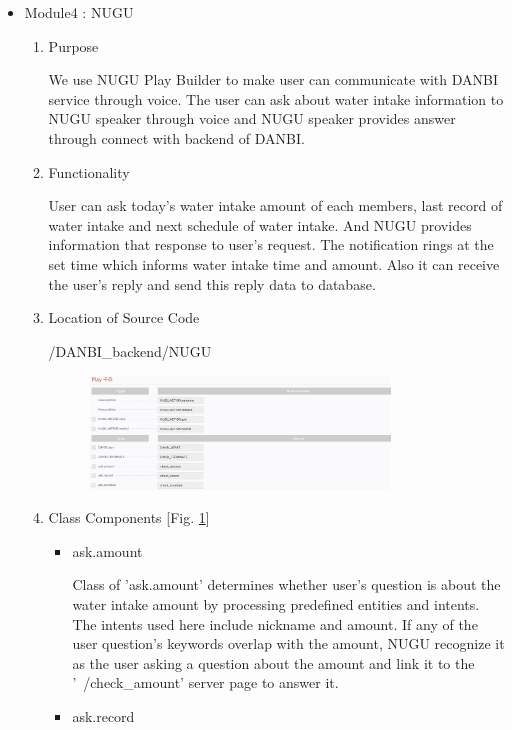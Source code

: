 \documentclass[conference]{IEEEtran}
\begin{document}
\begin{itemize}
    \item Module4 : NUGU
    \begin{enumerate}
    \setlength{\parindent}{2ex}
    \setlength{\parskip}{0.5em}
        \item Purpose
        
        We use NUGU Play Builder to make user can communicate with  DANBI service through voice. The user can ask about water intake information to NUGU speaker through voice and NUGU speaker provides answer through connect with backend of DANBI.
        \item Functionality
        
        User can ask today's water intake amount of each members, last record of water intake and next schedule of water intake. And NUGU provides information that response to user's request. The notification rings at the set time which informs water intake time and amount. Also it can receive the user's reply and send this reply data to database.
        \item Location of Source Code
        
        /DANBI\_backend/NUGU
        \par \begin{figure}[h!]
        \includegraphics[width=8cm]{image/NUGU.jpg}
        \centering
        \caption{}
        \label{fig:NUGU}
        \end{figure}
        \item Class Components [Fig. \ref{fig:NUGU}]
        \begin{itemize}
            \item ask.amount 
            \setlength{\parindent}{2ex}
            
            Class of 'ask.amount' determines whether user's question is about the water intake amount by processing predefined entities and intents. The intents used here include {{nickname}} and {{amount}}. If any of the user question's keywords overlap with the {{amount}}, NUGU recognize it as the user asking a question about the amount and link it to the '~/check\_amount' server page to answer it.
            \item ask.record 
            \setlength{\parindent}{2ex}
            

\end{itemize}
\end{enumerate}
\end{itemize}
\end{document}

